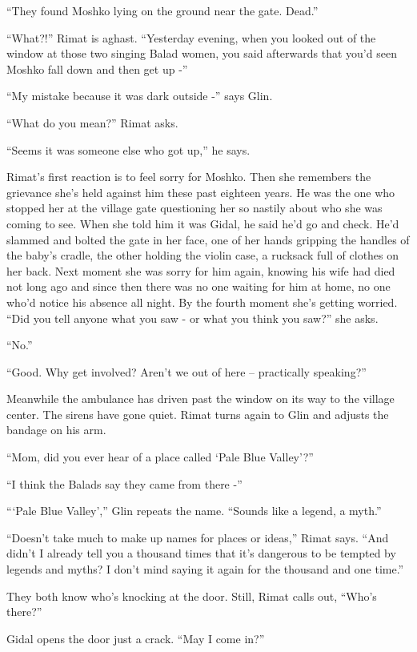 \documentclass[twoside,11pt]{book}
\begin{document}
``They found Moshko lying on the ground near the gate. Dead.''

``What?!'' Rimat is aghast. ``Yesterday evening, when you looked
out of the window at those two singing Balad women, you said afterwards that you'd seen Moshko fall down and then get
up -''

``My mistake because it was dark outside -'' says Glin.

``What do you mean?'' Rimat asks.

``Seems it was someone else who got up,'' he says.

Rimat's first reaction is to feel sorry for Moshko. Then she remembers the grievance she's held against him these
past eighteen years. He was the one who stopped her at the village gate questioning her so nastily
about who she was coming to see. When she told him it was Gidal, he said he'd go and check. He'd slammed and bolted the
gate in her face, one of her hands gripping the handles of the baby's cradle, the other holding the violin case, a
rucksack full of clothes on her back. Next moment she was sorry for him again, knowing his wife had died not long ago
and since then there was no one waiting for him at home, no one who'd notice his absence all night. By the fourth
moment she's getting worried. ``Did you tell anyone what you saw - or what you think you
saw?'' she asks.

``No.''

``Good. Why get involved? Aren't we out of here -- practically speaking?''

Meanwhile the ambulance has driven past the window on its way to the village center. The sirens have gone quiet. Rimat
turns again to Glin and adjusts the bandage on his arm.

``Mom, did you ever hear of a place called `Pale Blue Valley'?''

``I think the Balads say they came from there -''

``{`Pale Blue Valley'},'' Glin repeats the name. ``Sounds like a legend, a
myth.''

``Doesn't take much to make up names for places or ideas,'' Rimat says. ``And
didn't I already tell you a thousand times that it's dangerous to be tempted by legends and myths? I don't mind
saying it again for the thousand and one time.''

They both know who's knocking at the door. Still, Rimat calls out, ``Who's there?''

Gidal opens the door just a crack. ``May I come in?''
\end{document}
